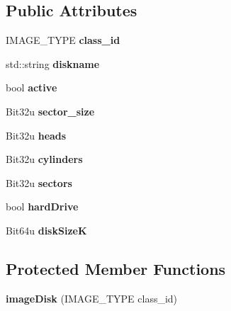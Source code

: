 \subsection*{Public Attributes}
\begin{DoxyCompactItemize}
\item 
\hypertarget{classimageDisk_a594ee035ea6bf97cf39808c128b02623}{I\-M\-A\-G\-E\-\_\-\-T\-Y\-P\-E {\bfseries class\-\_\-id}}\label{classimageDisk_a594ee035ea6bf97cf39808c128b02623}

\item 
\hypertarget{classimageDisk_a05e629958277f26ed5a65cbf5e6fd193}{std\-::string {\bfseries diskname}}\label{classimageDisk_a05e629958277f26ed5a65cbf5e6fd193}

\item 
\hypertarget{classimageDisk_a58c8bf6765666eee5924a0df9b02a8b8}{bool {\bfseries active}}\label{classimageDisk_a58c8bf6765666eee5924a0df9b02a8b8}

\item 
\hypertarget{classimageDisk_a7550e00e3553d110ba1b0851178d8157}{Bit32u {\bfseries sector\-\_\-size}}\label{classimageDisk_a7550e00e3553d110ba1b0851178d8157}

\item 
\hypertarget{classimageDisk_a725ce0c18709434c03d913f12418605f}{Bit32u {\bfseries heads}}\label{classimageDisk_a725ce0c18709434c03d913f12418605f}

\item 
\hypertarget{classimageDisk_a408e3710449fc535836dea5deb51342a}{Bit32u {\bfseries cylinders}}\label{classimageDisk_a408e3710449fc535836dea5deb51342a}

\item 
\hypertarget{classimageDisk_aa301426df1ed93f8804890500ae137ce}{Bit32u {\bfseries sectors}}\label{classimageDisk_aa301426df1ed93f8804890500ae137ce}

\item 
\hypertarget{classimageDisk_a24521e7464982eb8b0cf93c104981a78}{bool {\bfseries hard\-Drive}}\label{classimageDisk_a24521e7464982eb8b0cf93c104981a78}

\item 
\hypertarget{classimageDisk_a5d19bf7107726cbe58f2d2d9b4b71a12}{Bit64u {\bfseries disk\-Size\-K}}\label{classimageDisk_a5d19bf7107726cbe58f2d2d9b4b71a12}

\end{DoxyCompactItemize}
\subsection*{Protected Member Functions}
\begin{DoxyCompactItemize}
\item 
\hypertarget{classimageDisk_ac50b5252fd284058a8fa500b905853d1}{{\bfseries image\-Disk} (I\-M\-A\-G\-E\-\_\-\-T\-Y\-P\-E class\-\_\-id)}\label{classimageDisk_ac50b5252fd284058a8fa500b905853d1}

\end{DoxyCompactItemize}
